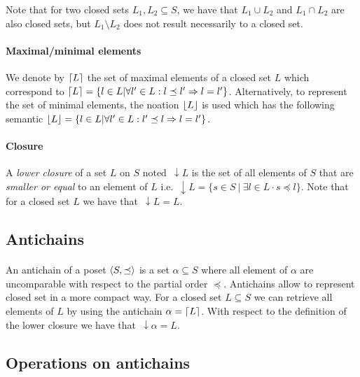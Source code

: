 \documentclass[letterpaper]{memoir}
\DeclarePairedDelimiter{\ceil}{\lceil}{\rceil}
\DeclarePairedDelimiter{\floor}{\lfloor}{\rfloor}
\DeclarePairedDelimiter{\tuple}{\langle}{\rangle}
\newcommand{\darrow}{\, \downarrow \!\!}
\begin{document}
Note that for two closed sets $L_1, L_2 \subseteq S$, we have that
$L_1 \cup L_2$ and $L_1 \cap L_2$ are also closed sets,
but $L_1 \setminus L_2$ does not result necessarily to a closed set.

\paragraph{Maximal/minimal elements} We denote by $\ceil{L}$
the set of maximal elements of a closed set $L$ which
correspond to $\ceil{L} = \{ l \in L | \forall l' \in L :  l \preceq l'
 \Rightarrow l = l' \}$. Alternatively, to represent the set of minimal
 elements, the noation $\floor{L}$ is used which has the following semantic
$\floor{L} = \{ l \in L | \forall l' \in L :  l' \preceq l
 \Rightarrow l = l' \}$.


\paragraph{Closure} A \textit{lower closure} of a set $L$ on $S$
noted $\darrow L$ is the set of all elements of $S$ that are
\textit{smaller or equal} to an element of $L$ i.e.
$\darrow L = \{ s \in S \ | \ \exists l \in L \cdot s \preceq l\}$.
Note that for a closed set $L$ we have that $\darrow L = L$.


\subsection{Antichains}

\paragraph{}

An antichain of a poset $\tuple{S, \preceq}$
is a set $\alpha \subseteq S$ where all element of $\alpha$
are uncomparable with respect to the partial order $\preceq$.
Antichains allow to represent closed set in a more compact way.
For a closed set $L \subseteq S$ we can retrieve all elements of $L$ by using
the antichain $\alpha = \ceil{L}$. With respect
to the definition of the lower closure we have that $\darrow \alpha = L$.

\subsection{Operations on antichains}

\end{document}
